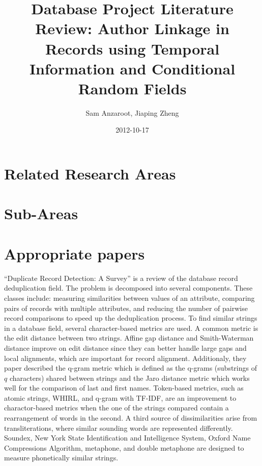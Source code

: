 \documentclass[]{article}
\title{Database Project Literature Review: Author Linkage in Records using Temporal Information and Conditional Random Fields}
\author{Sam Anzaroot, Jiaping Zheng}
\date{2012-10-17}
\begin{document}
\ifpdf
{}
\else
{}
\fi

\maketitle

\section{Related Research Areas} %
\label{sec:related_research_areas}


\section{Sub-Areas} %
\label{sec:sub_areas}


\section{Appropriate papers} %
\label{sec:appropriate_papers}
``Duplicate Record Detection: A Survey'' is a review of the database record deduplication field.  The problem is decomposed into several components. These classes include: measuring similarities between values of an attribute, comparing pairs of records with multiple attributes, and reducing the number of pairwise record comparisons to speed up the deduplication process.  To find similar strings in a database field, several character-based metrics are used.  A common metric is the edit distance between two strings.  Affine gap distance and Smith-Waterman distance improve on edit distance since they can better handle large gaps and local alignments, which are important for record alignment.  Additionaly, they paper described the q-gram metric which is defined as the q-grams (substrings of $q$ characters) shared between strings and the Jaro distance metric which works well for the comparison of last and first names.  Token-based metrics, such as atomic strings, WHIRL, and q-gram with TF-IDF, are an improvement to charactor-based metrics when the one of the strings compared contain a rearrangement of words in the second.  A third source of dissimilarities arise from transliterations, where similar sounding words are represented differently.  Soundex, New York State Identification and Intelligence System, Oxford Name Compressions Algorithm, metaphone, and double metaphone are designed to measure phonetically similar strings.  
\end{document}
